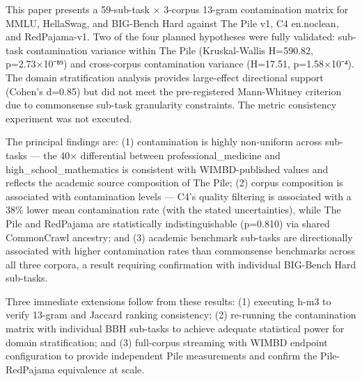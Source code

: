 
This paper presents a 59-sub-task × 3-corpus 13-gram contamination matrix for MMLU, HellaSwag, and BIG-Bench Hard against The Pile v1, C4 en.noclean, and RedPajama-v1. Two of the four planned hypotheses were fully validated: sub-task contamination variance within The Pile (Kruskal-Wallis H=590.82, p=2.73×10⁻⁸⁹) and cross-corpus contamination variance (H=17.51, p=1.58×10⁻⁴). The domain stratification analysis provides large-effect directional support (Cohen's d=0.85) but did not meet the pre-registered Mann-Whitney criterion due to commonsense sub-task granularity constraints. The metric consistency experiment was not executed.

The principal findings are: (1) contamination is highly non-uniform across sub-tasks — the 40× differential between professional_medicine and high_school_mathematics is consistent with WIMBD-published values and reflects the academic source composition of The Pile; (2) corpus composition is associated with contamination levels — C4's quality filtering is associated with a 38\% lower mean contamination rate (with the stated uncertainties), while The Pile and RedPajama are statistically indistinguishable (p=0.810) via shared CommonCrawl ancestry; and (3) academic benchmark sub-tasks are directionally associated with higher contamination rates than commonsense benchmarks across all three corpora, a result requiring confirmation with individual BIG-Bench Hard sub-tasks.

Three immediate extensions follow from these results: (1) executing h-m3 to verify 13-gram and Jaccard ranking consistency; (2) re-running the contamination matrix with individual BBH sub-tasks to achieve adequate statistical power for domain stratification; and (3) full-corpus streaming with WIMBD endpoint configuration to provide independent Pile measurements and confirm the Pile-RedPajama equivalence at scale.

